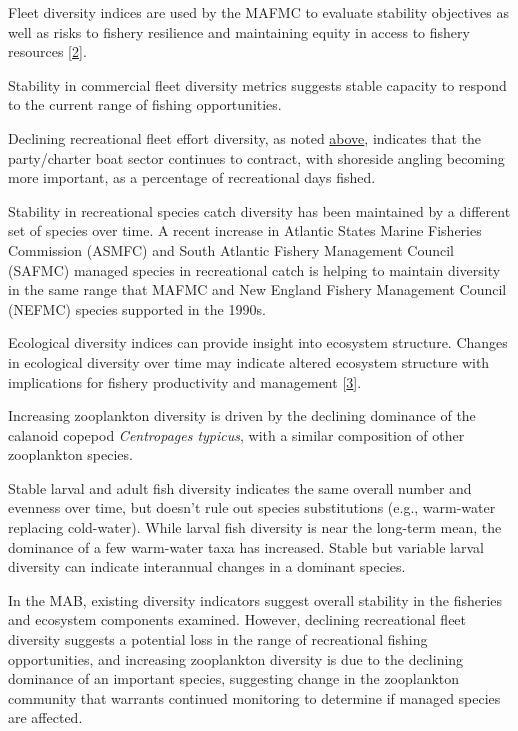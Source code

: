 \documentclass[
  10pt,
]{article}
\begin{document}
Fleet diversity indices are used by the MAFMC to evaluate stability
objectives as well as risks to fishery resilience and maintaining equity
in access to fishery resources
{[}\protect\hyperlink{ref-gaichas_implementing_2018}{2}{]}.

Stability in commercial fleet diversity metrics suggests stable capacity
to respond to the current range of fishing opportunities.

Declining recreational fleet effort diversity, as noted
\protect\hyperlink{recreational-opportunities}{above}, indicates that
the party/charter boat sector continues to contract, with shoreside
angling becoming more important, as a percentage of recreational days
fished.

Stability in recreational species catch diversity has been maintained by
a different set of species over time. A recent increase in Atlantic
States Marine Fisheries Commission (ASMFC) and South Atlantic Fishery
Management Council (SAFMC) managed species in recreational catch is
helping to maintain diversity in the same range that MAFMC and New
England Fishery Management Council (NEFMC) species supported in the
1990s.

Ecological diversity indices can provide insight into ecosystem
structure. Changes in ecological diversity over time may indicate
altered ecosystem structure with implications for fishery productivity
and management {[}\protect\hyperlink{ref-friedland_changes_2020}{3}{]}.

Increasing zooplankton diversity is driven by the declining dominance of
the calanoid copepod \emph{Centropages typicus}, with a similar
composition of other zooplankton species.

Stable larval and adult fish diversity indicates the same overall number
and evenness over time, but doesn't rule out species substitutions
(e.g., warm-water replacing cold-water). While larval fish diversity is
near the long-term mean, the dominance of a few warm-water taxa has
increased. Stable but variable larval diversity can indicate interannual
changes in a dominant species.

In the MAB, existing diversity indicators suggest overall stability in
the fisheries and ecosystem components examined. However, declining
recreational fleet diversity suggests a potential loss in the range of
recreational fishing opportunities, and increasing zooplankton diversity
is due to the declining dominance of an important species, suggesting
change in the zooplankton community that warrants continued monitoring
to determine if managed species are affected.
\end{document}
